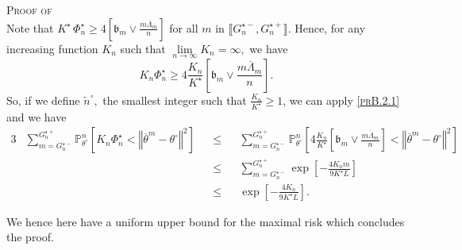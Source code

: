 \begin{pro}{\textsc{Proof of } \\}
Note that $K^{\star} \, \Phi_{n}^{\star} \geq 4 \left[\mathfrak{b}_{m} \vee \frac{m \overline{\Lambda}_{m}}{n}\right]$ for all $m$ in $\llbracket G_{n}^{\star-}, G_{n}^{\star+} \rrbracket$.
Hence, for any increasing function $K_{n}$ such that $\lim\limits_{n \rightarrow \infty} K_{n} = \infty,$ we have
\[K_{n} \Phi_{n}^{\star} \geq 4 \frac{K_{n}}{K^{\star}} \left[\mathfrak{b}_{m} \vee \frac{m \overline{\Lambda}_{m}}{n}\right].\]
So, if we define $\tilde{n}^{\circ},$ the smallest integer such that $\frac{K_{n}}{K^{\star}} \geq 1$, we can apply \textsc{\cref{prB.2.1}} and we have
\begin{alignat*}{3}
& \sum\limits_{m = G_{n}^{\star -}}^{G_{n}^{\star +}} \mathds{P}_{\theta^{\circ}}^{n}\left[K_{n} \Phi_{n}^{\star} < \left\Vert \overline{\theta}^{m} - \theta^{\circ} \right\Vert^{2}\right] && \leq && \sum\limits_{m = G_{n}^{\star-}}^{G_{n}^{\star+}} \mathds{P}_{\theta^{\circ}}^{n}\left[4 \frac{K_{n}}{K^{\star}} \left[\mathfrak{b}_{m} \vee \frac{m \overline{\Lambda}_{m}}{n}\right] < \left\Vert \overline{\theta}^{m} - \theta^{\circ} \right\Vert^{2}\right] \\
& && \leq && \sum\limits_{m = G_{n}^{\star-}}^{G_{n}^{\star+}} \exp\left[-\frac{4 K_{n} m}{9 K^{\star} L}\right]\\
& && \leq && \exp\left[-\frac{4 K_{n}}{9 K^{\star} L}\right].
\end{alignat*}

We hence here have a uniform upper bound for the maximal risk which concludes the proof.
\end{pro}